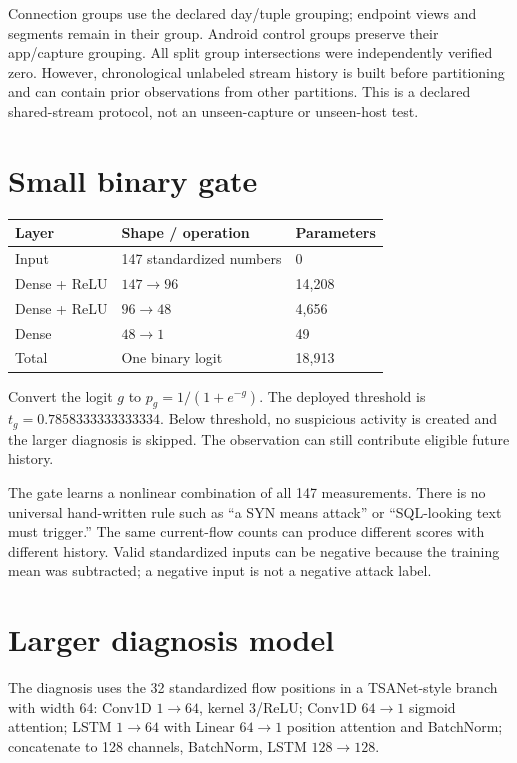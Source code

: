 \documentclass[11pt,a4paper,oneside]{report}
\begin{document}
Connection groups use the declared day/tuple grouping; endpoint views and segments remain in their group. Android control groups preserve their app/capture grouping. All split group intersections were independently verified zero. However, chronological unlabeled stream history is built before partitioning and can contain prior observations from other partitions. This is a declared shared-stream protocol, not an unseen-capture or unseen-host test.

\section{Small binary gate}
\begin{center}
\begin{tabular}{lll}\toprule Layer & Shape / operation & Parameters\\\midrule
Input & 147 standardized numbers & 0\\
Dense + ReLU & $147\to96$ & 14,208\\
Dense + ReLU & $96\to48$ & 4,656\\
Dense & $48\to1$ & 49\\\midrule
Total & One binary logit & 18,913\\\bottomrule\end{tabular}
\end{center}
Convert the logit $g$ to $p_g=1/(1+e^{-g})$. The deployed threshold is $t_g=0.7858333333333334$. Below threshold, no suspicious activity is created and the larger diagnosis is skipped. The observation can still contribute eligible future history.

The gate learns a nonlinear combination of all 147 measurements. There is no universal hand-written rule such as ``a SYN means attack'' or ``SQL-looking text must trigger.'' The same current-flow counts can produce different scores with different history. Valid standardized inputs can be negative because the training mean was subtracted; a negative input is not a negative attack label.

\section{Larger diagnosis model}
The diagnosis uses the 32 standardized flow positions in a TSANet-style branch with width 64: Conv1D $1\to64$, kernel 3/ReLU; Conv1D $64\to1$ sigmoid attention; LSTM $1\to64$ with Linear $64\to1$ position attention and BatchNorm; concatenate to 128 channels, BatchNorm, LSTM $128\to128$.
\end{document}

